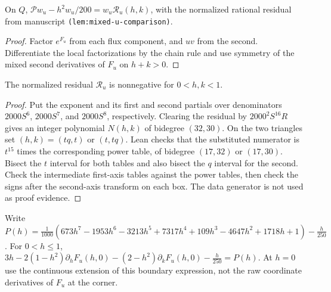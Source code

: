 \begin{lemma}
\label{lem:mixed-u-residual-identity}
\leanok
On $Q$, $\mathcal Pw_u-h^2w_u/200=w_u\mathcal R_u(h,k)$, with the
normalized rational residual from manuscript \texttt{(lem:mixed-u-comparison)}.
\end{lemma}

\begin{proof}
\leanok
Factor $e^{F_u}$ from each flux component, and $uv$ from the second.
Differentiate the local factorizations by the chain rule and use symmetry
of the mixed second derivatives of $F_u$ on $h+k>0$.
\end{proof}

\begin{lemma}
\label{cert:odd-a}
\leanok
The normalized residual $\mathcal R_u$ is nonnegative for $0<h,k<1$.
\end{lemma}

\begin{proof}
\leanok
Put the exponent and its first and second partials over denominators
$2000S^6$, $2000S^7$, and $2000S^8$, respectively. Clearing the residual
by $2000^2 S^{16}R$ gives an integer polynomial $N(h,k)$ of bidegree
$(32,30)$. On the two triangles set $(h,k)=(tq,t)$ or $(t,tq)$.
Lean checks that the substituted numerator is $t^{15}$ times the
corresponding power table, of bidegree $(17,32)$ or $(17,30)$.
Bisect the $t$ interval for both tables and also bisect the $q$ interval
for the second. Check the intermediate first-axis tables against the power
tables, then check the signs after the second-axis transform on each box.
The data generator is not used as proof evidence.
\end{proof}

\begin{lemma}
\label{lem:mixed-robin-identity}
\leanok
Write
$P(h)=\tfrac1{1000}(673h^7-1953h^6-3213h^5+7317h^4+109h^3-4647h^2+1718h+1)-\tfrac h{250}$.
For $0<h\le1$,
$3h-2(1-h^2)\partial_hF_u(h,0)-(2-h^2)\partial_kF_u(h,0)-\tfrac h{250}=P(h)$.
At $h=0$ use the continuous extension of this boundary expression, not the
raw coordinate derivatives of $F_u$ at the corner.
\end{lemma}

